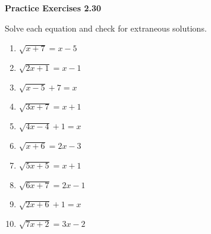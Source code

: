\vspace{1ex}
\noindent\textbf{Practice Exercises 2.30}

\vspace{0.75ex}

Solve each equation and check for extraneous solutions.

\begin{multicols}{2}
\begin{enumerate}[noitemsep, label = \color{blue}\arabic*. ]
    \item \( \sqrt{x + 7} = x - 5 \)
    \item \( \sqrt{2x + 1} = x - 1 \)
    \item \( \sqrt{x - 5} + 7 = x \)
    \item \( \sqrt{3x + 7} = x + 1 \)
    \item \( \sqrt{4x - 4} + 1 = x \)
    \item \( \sqrt{x + 6} = 2x - 3 \)
    \item \( \sqrt{5x + 5} = x + 1 \)
    \item \( \sqrt{6x + 7} = 2x - 1 \)
    \item \( \sqrt{2x + 6} + 1 = x \)
    \item \( \sqrt{7x + 2} = 3x - 2 \)
\end{enumerate}
\end{multicols}

